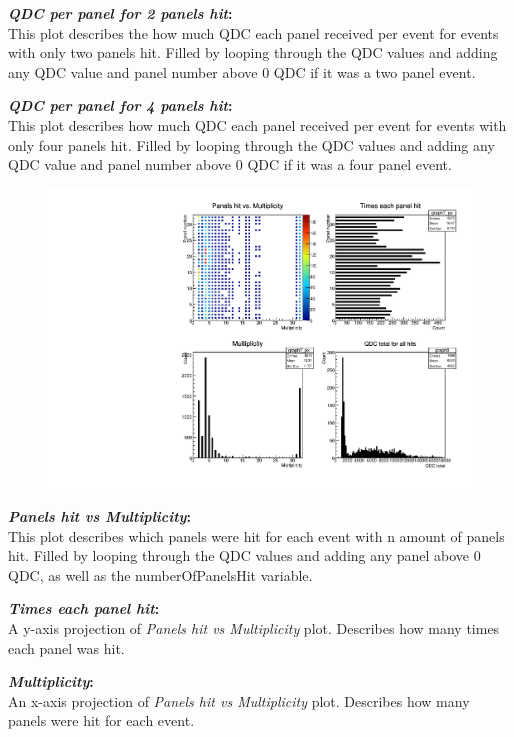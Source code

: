 \documentclass[a4paper,12pt]{article}
\begin{document}
\textbf{\emph{QDC per panel for 2 panels hit}:} \\
This plot describes the how much QDC each panel received per event for events with only two panels hit. Filled by looping through the QDC values and adding any QDC value and panel number above 0 QDC if it was a two panel event.

\textbf{\emph{QDC per panel for 4 panels hit}:} \\
This plot describes how much QDC each panel received per event for events with only four panels hit. Filled by looping through the QDC values and adding any QDC value and panel number above 0 QDC if it was a four panel event.

\pagebreak
\begin{figure}[h]
\centering
\includegraphics[scale=0.8]{Projections.pdf}
\end{figure}

\textbf{\emph{Panels hit vs Multiplicity}:} \\
This plot describes which panels were hit for each event with n amount of panels hit. Filled by looping through the QDC values and adding any panel above 0 QDC, as well as the numberOfPanelsHit variable.

\textbf{\emph{Times each panel hit}:} \\
A y-axis projection of \emph{Panels hit vs Multiplicity} plot. Describes how many times each panel was hit.

\textbf{\emph{Multiplicity}:} \\
An x-axis projection of \emph{Panels hit vs Multiplicity} plot. Describes how many panels were hit for each event.
\end{document}
